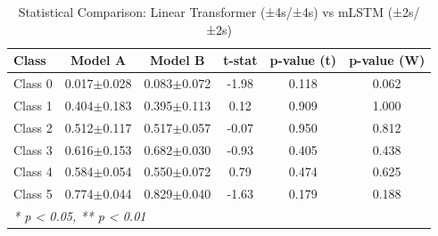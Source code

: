 \begin{table}[htbp]
\centering
\caption{Statistical Comparison: Linear Transformer (±4s/±4s) vs mLSTM (±2s/±2s)}
\label{tab:comparison_class_linear_transformer_±4s_±4s_vs_mlstm_±2s_±2s}
\begin{tabular}{lccccc}
\toprule
\textbf{Class} & \textbf{Model A} & \textbf{Model B} & \textbf{t-stat} & \textbf{p-value (t)} & \textbf{p-value (W)} \\
\midrule
Class 0 & 0.017$\pm$0.028 & 0.083$\pm$0.072 & -1.98 & 0.118 & 0.062 \\
Class 1 & 0.404$\pm$0.183 & 0.395$\pm$0.113 & 0.12 & 0.909 & 1.000 \\
Class 2 & 0.512$\pm$0.117 & 0.517$\pm$0.057 & -0.07 & 0.950 & 0.812 \\
Class 3 & 0.616$\pm$0.153 & 0.682$\pm$0.030 & -0.93 & 0.405 & 0.438 \\
Class 4 & 0.584$\pm$0.054 & 0.550$\pm$0.072 & 0.79 & 0.474 & 0.625 \\
Class 5 & 0.774$\pm$0.044 & 0.829$\pm$0.040 & -1.63 & 0.179 & 0.188 \\
\bottomrule
\multicolumn{6}{l}{\textit{* p < 0.05, ** p < 0.01}} \\
\end{tabular}
\end{table}